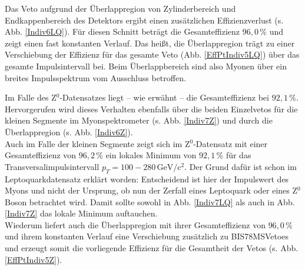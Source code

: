 Das Veto aufgrund der Überlappregion von Zylinderbereich und Endkappenbereich des Detektors ergibt einen zusätzlichen Effizienzverlust (s. Abb. \ref{Indiv6LQ}). Für diesen Schnitt beträgt die Gesamteffizienz $96,0\,\%$ und zeigt einen fast konstanten Verlauf. Das heißt, die Überlappregion trägt zu einer Verschiebung der Effizienz für das gesamte Veto (Abb. \ref{EffPtIndiv5LQ}) über das gesamte Impulsintervall bei. Beim Überlappbereich sind also Myonen über ein breites Impulsspektrum vom Ausschluss betroffen. 

Im Falle des Z$^0$-Datensatzes liegt -- wie erwähnt -- die Gesamteffizienz bei $92,1\,\%$. Hervorgerufen wird dieses Verhalten ebenfalls über die beiden Einzelvetos für die kleinen Segmente im Myonspektrometer (s. Abb. \ref{Indiv7Z}) und durch die Überlappregion (s. Abb. \ref{Indiv6Z}).\\
Auch im Falle der kleinen Segmente zeigt sich im Z$^0$-Datensatz mit einer Gesamteffizienz von $96,2\,\%$ ein lokales Minimum von $92,1\,\%$ für das Transversalimpulsintervall $p_T=100-280\,\text{GeV}/\text{c}^2$. Der Grund dafür ist schon im Leptoquarkdatensatz erklärt worden: Entscheidend ist hier der Impulswert des Myons und nicht der Ursprung, ob nun der Zerfall eines Leptoquark oder eines Z$^0$ Boson betrachtet wird. Damit sollte sowohl in Abb. \ref{Indiv7LQ} als auch in Abb. \ref{Indiv7Z} das lokale Minimum auftauchen.\\
Wiederum liefert auch die Überlappregion mit ihrer Gesamteffizienz von $96,0\,\%$ und ihrem konstanten Verlauf eine Verschiebung zusätzlich zu BIS78MSVetoes und erzeugt somit die vorliegende Effizienz für die Gesamtheit der Vetos (s. Abb. \ref{EffPtIndiv5Z}).

